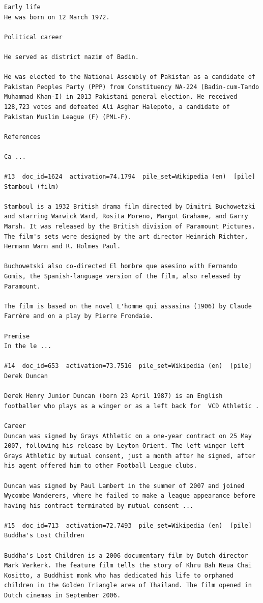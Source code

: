 \begin{verbatim}
Early life
He was born on 12 March 1972.

Political career

He served as district nazim of Badin.

He was elected to the National Assembly of Pakistan as a candidate of Pakistan Peoples Party (PPP) from Constituency NA-224 (Badin-cum-Tando Muhammad Khan-I) in 2013 Pakistani general election. He received 128,723 votes and defeated Ali Asghar Halepoto, a candidate of Pakistan Muslim League (F) (PML-F).

References

Ca ...

#13  doc_id=1624  activation=74.1794  pile_set=Wikipedia (en)  [pile]
Stamboul (film)

Stamboul is a 1932 British drama film directed by Dimitri Buchowetzki and starring Warwick Ward, Rosita Moreno, Margot Grahame, and Garry Marsh. It was released by the British division of Paramount Pictures. The film's sets were designed by the art director Heinrich Richter, Hermann Warm and R. Holmes Paul.

Buchowetski also co-directed El hombre que asesino with Fernando Gomis, the Spanish-language version of the film, also released by Paramount. 

The film is based on the novel L'homme qui assasina (1906) by Claude Farrère and on a play by Pierre Frondaie.

Premise
In the le ...

#14  doc_id=653  activation=73.7516  pile_set=Wikipedia (en)  [pile]
Derek Duncan

Derek Henry Junior Duncan (born 23 April 1987) is an English footballer who plays as a winger or as a left back for  VCD Athletic .

Career
Duncan was signed by Grays Athletic on a one-year contract on 25 May 2007, following his release by Leyton Orient. The left-winger left Grays Athletic by mutual consent, just a month after he signed, after his agent offered him to other Football League clubs.

Duncan was signed by Paul Lambert in the summer of 2007 and joined Wycombe Wanderers, where he failed to make a league appearance before having his contract terminated by mutual consent ...

#15  doc_id=713  activation=72.7493  pile_set=Wikipedia (en)  [pile]
Buddha's Lost Children

Buddha's Lost Children is a 2006 documentary film by Dutch director Mark Verkerk. The feature film tells the story of Khru Bah Neua Chai Kositto, a Buddhist monk who has dedicated his life to orphaned children in the Golden Triangle area of Thailand. The film opened in Dutch cinemas in September 2006.


\end{verbatim}
